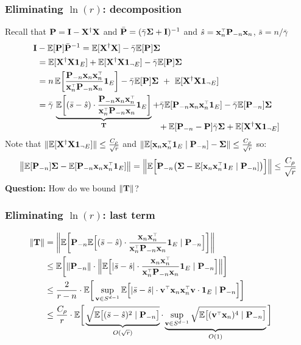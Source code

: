 \documentclass[10pt]{beamer}
\begin{document}
\begin{frame}
  \frametitle{Eliminating $\ln(r)$: decomposition}
  Recall that $\mathbf P=\mathbf I-\mathbf X^\dagger\mathbf X$ and
  $\bar{\mathbf P}=(\bar\gamma\mathbf{\Sigma}+\mathbf I)^{-1}$ and $\hat s =
  \x_n^\top\P_{-n}\x_n$, $\bar s=n/\bar\gamma$
\begin{align*}
\hspace{-5mm}\I&-\E[\P]\bar\P^{-1}
  = \E[\X^\dagger\X] - \bar\gamma\E[\P]\Sigmab\\
  &= \E[\X^\dagger\X\one_E] +
    \E[\X^\dagger\X \one_{\neg E}]
    -\bar\gamma\E[\P]\Sigmab\\
  &=n\,\E\bigg[\frac{\P_{-n}\x_n\x_n^\top}{\x_n^\top\P_{-n}\x_n}\one_E\bigg]
    -\bar\gamma\E[\P]\Sigmab \ +\     \E[\X^\dagger\X\one_{\neg E}]\\
  &=\bar\gamma\,\underbrace{\E\bigg[(\bar s-\hat
    s)\cdot\frac{\P_{-n}\x_n\x_n^\top}{\x_n^\top\P_{-n}\x_n}\one_E\bigg]}_{\T}
  + \bar\gamma\E[\P_{-n}\x_n\x_n^\top\one_E] -\bar\gamma\E[\P_{-n}]\Sigmab \\[-4mm]
  &\hspace{5cm}+ \E[\P_{-n}-\P]\bar\gamma\Sigmab +\E[\X^\dagger\X\one_{\neg E}]
\end{align*}
Note that $\|\mathbb E[\mathbf X^\dagger\mathbf X\mathbf 1_{\neg E}]\|\leq \frac{C_\rho}{\sqrt{r}}$ and $\|\E[\x_n\x_n^\top\one_E\mid\P_{-n}]-\Sigmab\|\leq
\frac{C_\rho}{\sqrt{r}}$ so:
\begin{align*}
\big\|\E[\P_{-n}]\Sigmab -
\E[\P_{-n}\x_n\x_n^\top\one_E]\big\|
  =\Big\|\E\Big[\P_{-n}\big(\Sigmab-\E[\x_n\x_n^\top\one_E\mid\P_{-n}]\big)\Big]\Big\|\leq \frac{C_\rho}{\sqrt{r}}
\end{align*}
\textbf{Question:} How do we bound $\|\mathbf{T}\|$?
\end{frame}

\begin{frame}
  \frametitle{Eliminating $\ln(r)$: last term}
\begin{align*}
\hspace{-8mm}   
\|\T\|    &= \bigg\|\E\bigg[\P_{-n}\E\Big[(\bar s-\hat s)\cdot
            \frac{\x_n\x_n^\top}{\x_n^\top\P_{-n}\x_n}\one_E\mid\P_{-n}\Big]\bigg]\bigg\|
  \\
  &\leq\E\bigg[\|\P_{-n}\|\cdot \Big\|\E\Big[|\bar s-\hat s|\cdot
    \frac{\x_n\x_n^\top}{\x_n^\top\P_{-n}\x_n}\one_E\mid\P_{-n}\Big]
    \Big\|\bigg]
  \\
          &\leq \frac2{r-n} \cdot \E\bigg[\sup_{\v\in S^{d-1}}\E\Big[
            |\bar s-\hat s|\cdot \v^\top\x_n\x_n^\top\v\cdot\one_E\mid
            \P_{-n}\Big]\bigg]
  \\
  &\leq \frac{C_\rho}{r}\cdot \E\bigg[\underbrace{\sqrt{\E\big[(\bar s-\hat
    s)^2\mid\P_{-n}\big]}}_{O(\sqrt r)}\cdot
    \underbrace{\sup_{\v\in S^{d-1}}\sqrt{\E\big[(\v^\top\x_n)^4\mid \P_{-n}\big]}}_{O(1)}\bigg]
   \end{align*}
 \end{frame}
\end{document}
